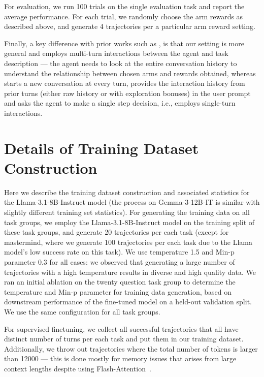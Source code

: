 For evaluation, we run 100 trials on the single evaluation task and report the average performance. For each trial, we randomly choose the arm rewards as described above, and generate 4 trajectories per a particular arm reward setting.

Finally, a key difference with prior works such as \citet{nie2024evolveevaluatingoptimizingllms}, is that our setting is more general and employs multi-turn interactions between the agent and task description --- the agent needs to look at the entire conversation history to understand the relationship between chosen arms and rewards obtained, whereas \citet{nie2024evolveevaluatingoptimizingllms} starts a new conversation at every turn, provides the interaction history from prior turns (either raw history or with exploration bonuses) in the user prompt and asks the agent to make a single step decision, i.e., employs single-turn interactions. 


\newpage

\section{Details of Training Dataset Construction}

Here we describe the training dataset construction and associated statistics for the Llama-3.1-8B-Instruct model (the process on Gemma-3-12B-IT is similar with slightly different training set statistics). For generating the training data on all task groups, we employ the Llama-3.1-8B-Instruct model on the training split of these task groups, and generate 20 trajectories per each task (except for mastermind, where we generate 100 trajectories per each task due to the Llama model's low success rate on this task). We use temperature 1.5 and Min-p parameter $0.3$ for all cases: we observed that generating a large number of trajectories with a high temperature results in diverse and high quality data. We ran an initial ablation on the twenty question task group to determine the temperature and Min-p parameter for training data generation, based on downstream performance of the fine-tuned model on a held-out validation split. We use the same configuration for all task groups.

For supervised finetuning, we collect all successful trajectories that all have distinct number of turns per each task and put them in our training dataset. Additionally, we throw out trajectories where the total number of tokens is larger than 12000 --- this is done mostly for memory issues that arises from large context lengths despite using Flash-Attention~\citep{dao2022flashattention,dao2023flashattention2}. 

